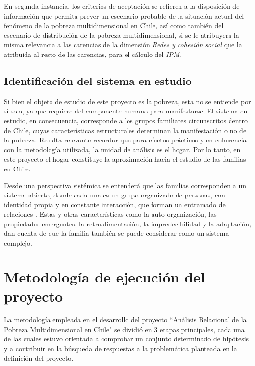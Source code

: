 \documentclass[12pt,letterpaper,spanish]{article}
\begin{document}
En segunda instancia, los criterios de aceptación se refieren a la disposición de información que permita prever un escenario probable de la situación actual del fenómeno de la pobreza multidimensional en Chile, así como también del escenario de distribución de la pobreza multidimensional, si se le atribuyera la misma relevancia a las carencias de la dimensión \textit{Redes y cohesión social} que la atribuida al resto de las carencias, para el cálculo del \textit{IPM}.



 













\subsection{Identificación del sistema en estudio}
Si bien el objeto de estudio de este proyecto es la pobreza, esta no se entiende por sí sola, ya que requiere del componente humano para manifestarse. El sistema en estudio, en consecuencia, corresponde a los grupos familiares circunscritos dentro de Chile, cuyas características estructurales determinan la manifestación o no de la pobreza. Resulta relevante recordar que para efectos prácticos y en coherencia con la metodología utilizada, la unidad de análisis es el hogar. Por lo tanto, en este proyecto el hogar constituye la aproximación hacia el estudio de las familias en Chile.

Desde una perspectiva sistémica se entenderá que las familias corresponden a un sistema abierto, donde cada una es un grupo organizado de personas, con identidad propia y en constante interacción, que forman un entramado de relaciones \cite{I.Espinal.2006ElFamilia}. Estas y otras características como la auto-organización, las propiedades emergentes, la retroalimentación, la impredecibilidad y la adaptación, dan cuenta de que la familia también se puede considerar como un sistema complejo.



\newpage
\section{Metodología de ejecución del proyecto} %

La metodología empleada en el desarrollo del proyecto ``Análisis Relacional de la Pobreza Multidimensional en Chile"  se dividió en 3 etapas principales, cada una de las cuales estuvo orientada a comprobar un conjunto determinado de hipótesis y a contribuir en la búsqueda de respuestas a la problemática planteada en la definición del proyecto.
\end{document}
